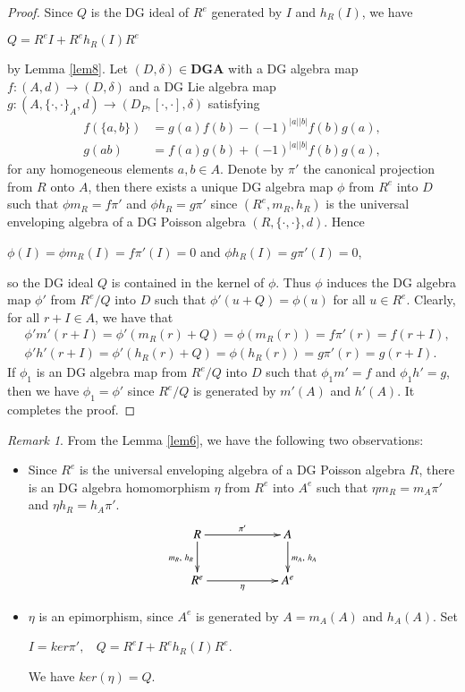 \documentclass[a4paper,10pt]{amsart}
\theoremstyle{definition}
\theoremstyle{remark}
\newtheorem{remark}[theorem]{Remark}
\numberwithin{equation}{section}
\begin{document}
\begin{proof}
Since  $Q$ is the DG ideal of $R^{e}$ generated by $I$ and $h_R(I)$,
we have
\begin{center}
$Q=R^{e}I+R^{e}h_R(I)R^{e}$
\end{center}
by Lemma \ref{lem8}. Let $(D, \delta)\in \textbf{DGA}$ with a DG algebra
map $f: (A, d)\rightarrow (D, \delta)$ and a DG Lie algebra map
$g: (A, \{\cdot, \cdot\}_A, d)\rightarrow (D_P, [\cdot, \cdot], \delta)$ satisfying
\begin{align*}
f(\{a, b\})&=g(a)f(b)-(-1)^{|a||b|}f(b)g(a),\\
g(ab)&=f(a)g(b)+(-1)^{|a||b|}f(b)g(a),
\end{align*}
for any homogeneous elements $a, b\in A$. Denote by $\pi'$ the
canonical projection from $R$ onto $A$, then there exists a unique
DG algebra map $\phi$ from $R^{e}$ into $D$ such that $\phi
m_R=f\pi'$ and $\phi h_R=g\pi'$ since $(R^{e}, m_R, h_R)$ is the
universal enveloping algebra of a DG Poisson algebra $(R, \{\cdot,
\cdot\}, d)$. Hence
\begin{center}
$\phi(I)=\phi m_R(I)=f\pi'(I)=0$ \quad and \quad $\phi h_R(I)=g\pi'(I)=0$,
\end{center}
so the DG ideal $Q$ is contained in the kernel of $\phi$. Thus
$\phi$ induces the DG algebra map $\phi'$ from $R^{e}/Q$ into $D$
such that $\phi'(u+Q)=\phi(u)$ for all $u\in R^{e}$. Clearly, for
all $r+I\in A$, we have that
\begin{equation}
\begin{split}
&\phi'm'(r+I)=\phi'(m_R(r)+Q)=\phi(m_R(r))=f\pi'(r)=f(r+I),\\
&\phi'h'(r+I)=\phi'(h_R(r)+Q)=\phi(h_R(r))=g\pi'(r)=g(r+I).
\end{split}\nonumber
\end{equation}
If $\phi_1$ is an DG algebra map from $R^{e}/Q$ into $D$ such that
$\phi_1m'=f$ and $\phi_1h'=g$, then we have $\phi_1=\phi'$ since
$R^{e}/Q$ is generated by $m'(A)$ and $h'(A)$. It completes the
proof.
\end{proof}

\begin{remark}\label{rmk1}
From the Lemma \ref{lem6}, we have the following two observations:
\begin{itemize}
  \item Since $R^{e}$ is the universal enveloping algebra of a DG Poisson
algebra $R$, there is an DG algebra homomorphism $\eta$ from $R^{e}$
into $A^e$ such that $\eta m_R=m_A\pi'$ and $\eta h_R=h_A\pi'$.
\begin{eqnarray*}
\xymatrix{
  R \ar[d]_{m_R, ~h_R}   \ar[rr]^{\pi'}
         &\       & A \ar[d]^{m_A, ~h_A}  \\
  R^{e}  \ar[rr]_{\eta}
         &  \     & A^e             }
\end{eqnarray*}
  \item $\eta$ is an epimorphism, since $A^e$
is generated by $A=m_A(A)$ and $h_A(A)$. Set
\begin{center}
$I=ker \pi', ~~~~Q=R^{e}I+R^{e}h_R(I)R^{e}$.
\end{center}
We have $ker(\eta)=Q$.
\end{itemize}
\end{remark}
\end{document}
